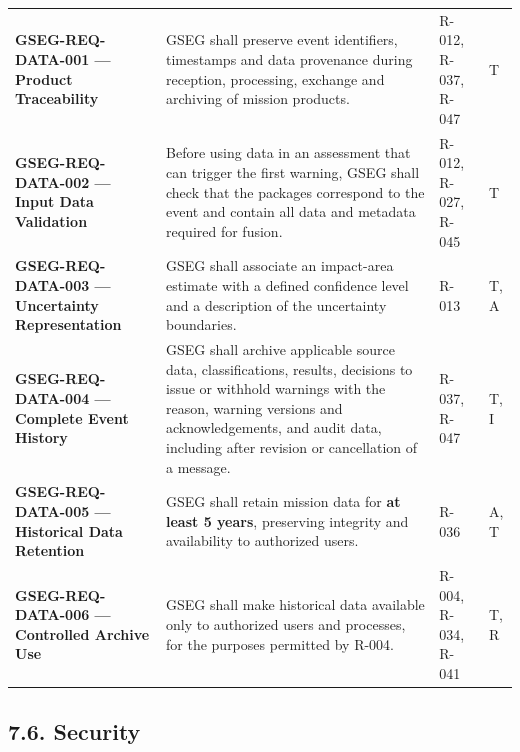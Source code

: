 \begingroup{}
\begin{longtable}{|P{0.27}|P{0.46}|P{0.16}|P{0.11}|}
\hline{}
 &  &  & \\ \hline
\endhead
\hline\endlastfoot
\textbf{GSEG-REQ-DATA-001 — Product Traceability} & GSEG shall preserve event identifiers, timestamps and data provenance during reception, processing, exchange and archiving of mission products. & R-012, R-037, R-047 & T\\ \hline
\textbf{GSEG-REQ-DATA-002 — Input Data Validation} & Before using data in an assessment that can trigger the first warning, GSEG shall check that the packages correspond to the event and contain all data and metadata required for fusion. & R-012, R-027, R-045 & T\\ \hline
\textbf{GSEG-REQ-DATA-003 — Uncertainty Representation} & GSEG shall associate an impact-area estimate with a defined confidence level and a description of the uncertainty boundaries. & R-013 & T, A\\ \hline
\textbf{GSEG-REQ-DATA-004 — Complete Event History} & GSEG shall archive applicable source data, classifications, results, decisions to issue or withhold warnings with the reason, warning versions and acknowledgements, and audit data, including after revision or cancellation of a message. & R-037, R-047 & T, I\\ \hline
\textbf{GSEG-REQ-DATA-005 — Historical Data Retention} & GSEG shall retain mission data for \textbf{at least 5 years}, preserving integrity and availability to authorized users. & R-036 & A, T\\ \hline
\textbf{GSEG-REQ-DATA-006 — Controlled Archive Use} & GSEG shall make historical data available only to authorized users and processes, for the purposes permitted by R-004. & R-004, R-034, R-041 & T, R\\*
\end{longtable}
\endgroup

\subsection{7.6. Security}\label{information-security-1}

